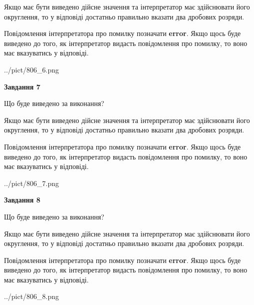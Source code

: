 \documentclass[12pt, ukrainian]{article}
\begin{document}
{\begin {Large}
Якщо має бути виведено дійсне значення та інтерпретатор має здійснювати його округлення, 
то у відповіді достатньо правильно вказати два дробових розряди.

Повідомлення інтерпретатора про помилку позначати \textbf{error}.
Якщо щось буде виведено до того, як інтерпретатор видасть повідомлення про помилку, 
то воно має вказуватись у відповіді. \par

\begin{center}
	{../pict/806_6.png}
\end{center}
\newpage

{\begin {center}\textbf{Завдання 7}\end {center}}\par
Що буде виведено за виконання? \par

Якщо має бути виведено дійсне значення та інтерпретатор має здійснювати його округлення, 
то у відповіді достатньо правильно вказати два дробових розряди.

Повідомлення інтерпретатора про помилку позначати \textbf{error}.
Якщо щось буде виведено до того, як інтерпретатор видасть повідомлення про помилку, 
то воно має вказуватись у відповіді. \par

\begin{center}
	{../pict/806_7.png}
\end{center}
\newpage

{\begin {center}\textbf{Завдання 8}\end {center}}\par
Що буде виведено за виконання? \par

Якщо має бути виведено дійсне значення та інтерпретатор має здійснювати його округлення, 
то у відповіді достатньо правильно вказати два дробових розряди.

Повідомлення інтерпретатора про помилку позначати \textbf{error}.
Якщо щось буде виведено до того, як інтерпретатор видасть повідомлення про помилку, 
то воно має вказуватись у відповіді. \par

\begin{center}
	{../pict/806_8.png}
\end{center}
\newpage


\end{Large}}
\end{document}
